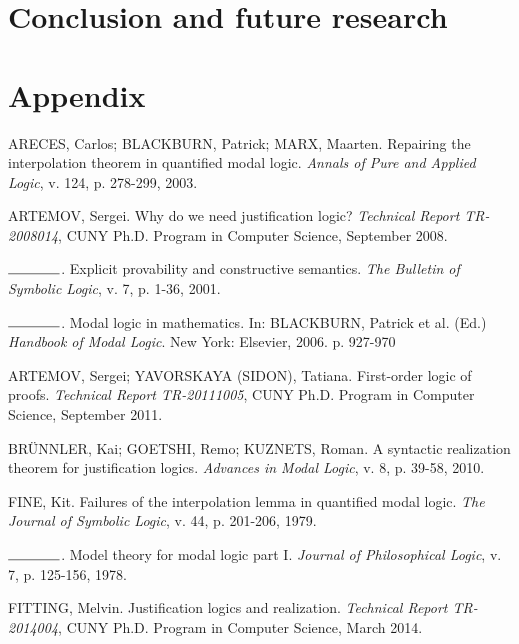 \documentclass[12pt]{report}
\theoremstyle{definition}
\begin{document}
\chapter{Conclusion and future research}


\chapter{Appendix}




\pagebreak
{}

\begin{thebibliography}{100} %
 ARECES, Carlos; BLACKBURN, Patrick; MARX, Maarten. Repairing the interpolation theorem in quantified modal logic.
{\it Annals of Pure and Applied Logic}, v. 124, p. 278-299, 2003.

 ARTEMOV, Sergei. Why do we need justification logic? \textit{Technical Report TR-2008014}, CUNY Ph.D. Program in Computer Science, September 2008.

 $\rule{1.30cm}{0.15mm}$. Explicit provability and constructive semantics. \textit{The Bulletin of Symbolic Logic}, v. 7, p. 1-36, 2001.

 $\rule{1.30cm}{0.15mm}$. Modal logic in mathematics. In: BLACKBURN, Patrick et al. (Ed.) \textit{Handbook of Modal Logic}. New York: Elsevier, 2006. p. 927-970

 ARTEMOV, Sergei; YAVORSKAYA (SIDON), Tatiana. First-order logic of proofs. \textit{Technical Report TR-20111005}, CUNY Ph.D. Program in Computer Science, September 2011.

 BR\"UNNLER, Kai; GOETSHI, Remo; KUZNETS, Roman. A syntactic realization theorem for justification logics. \textit{Advances in Modal Logic}, v. 8, p. 39-58, 2010.

 FINE, Kit. Failures of the interpolation lemma in quantified modal logic. \textit{The Journal of Symbolic Logic}, v. 44, p. 201-206, 1979.

 $\rule{1.30cm}{0.15mm}$. Model theory for modal logic part I. \textit{Journal of Philosophical Logic}, v. 7, p. 125-156, 1978.

 FITTING, Melvin. Justification logics and realization. \textit{Technical Report TR-2014004}, CUNY Ph.D. Program in Computer Science, March 2014.


\end{thebibliography}
\end{document}
